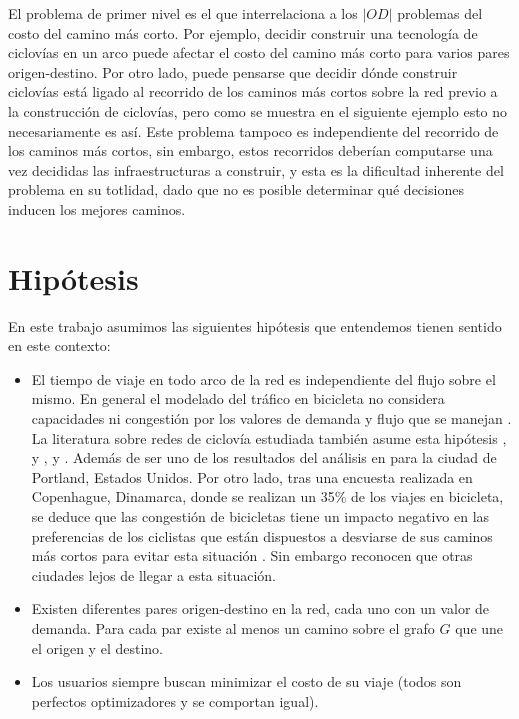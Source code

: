 El problema de primer nivel es el que interrelaciona a los $|OD|$ problemas del costo del camino más corto. Por ejemplo, decidir construir una tecnología de ciclovías en un arco puede afectar el costo del camino más corto para varios pares origen-destino. Por otro lado, puede pensarse que decidir dónde construir ciclovías está ligado al recorrido de los caminos más cortos sobre la red previo a la construcción de ciclovías, pero como se muestra en el siguiente ejemplo esto no necesariamente es así. Este problema tampoco es independiente del recorrido de los caminos más cortos, sin embargo, estos recorridos deberían computarse una vez decididas las infraestructuras a construir, y esta es la dificultad inherente del problema en su totlidad, dado que no es posible determinar qué decisiones inducen los mejores caminos.

\section{Hipótesis}

En este trabajo asumimos las siguientes hipótesis que entendemos tienen sentido en este contexto:

\begin{itemize}
  \item{El tiempo de viaje en todo arco de la red es independiente del flujo sobre el mismo. En general el modelado del tráfico en bicicleta no considera capacidades ni congestión por los valores de demanda y flujo que se manejan \citep{Sheffi1985}. La literatura sobre redes de ciclovía estudiada también asume esta hipótesis \cite{Lin2013}, \cite{Duthie2014} y \cite{Liu2019}, \cite{Zhu2019} y \cite{baya2021}. Además de ser uno de los resultados del análisis en \cite{broach2012} para la ciudad de Portland, Estados Unidos. Por otro lado, tras una encuesta realizada en Copenhague, Dinamarca, donde se realizan un 35\% de los viajes en bicicleta, se deduce que las congestión de bicicletas tiene un impacto negativo en las preferencias de los ciclistas que están dispuestos a desviarse de sus caminos más cortos para evitar esta situación \citep{Vedel2017}. Sin embargo reconocen que otras ciudades lejos de llegar a esta situación.}
  \item{Existen diferentes pares origen-destino en la red, cada uno con un valor de demanda. Para cada par existe al menos un camino sobre el grafo $G$ que une el origen y el destino.}
  \item{Los usuarios siempre buscan minimizar el costo de su viaje (todos son perfectos optimizadores y se comportan igual).}
\end{itemize}

